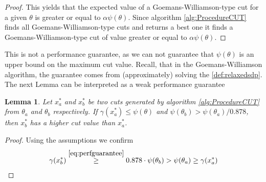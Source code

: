 \documentclass[12pt,a4paper]{article}
\theoremstyle{mythm}
\newtheorem{lem}[thm]{Lemma}
\begin{document}
\begin{proof}
This yields that the expected value of a Goemans-Williamson-type cut for a given $ \theta $ is greater or equal to $ \alpha \psi ( \theta)$. 
Since algorithm \ref{alg:ProcedureCUT} finds all Goemans-Williamson-type cuts and returns a best one it finds a Goemans-Williamson-type cut of value greater or equal to $ \alpha \psi ( \theta) $.

\end{proof}
This is not a performance guarantee, as we can not guarantee that $ \psi ( \theta)  $ is an upper bound on the maximum cut value.
Recall, that in the Goemans-Williamson algorithm, the guarantee comes from (approximately) solving the \SDP \ref{def:relaxedsdp}.
The next Lemma can be interpreted as a weak performance guarantee
\begin{lem}
Let $ x ^{*} _{ a } $ and $ x ^{*} _{ b } $ be two cuts generated by algorithm \ref{alg:ProcedureCUT} from $ \theta_a $ and $ \theta_b $ respectively.
If $ \gamma ( x ^{ * } _{ a } ) \leq \psi ( \theta) $ and $ \psi ( \theta _{ b } ) > \psi ( \theta_a)/0.878 $, then $ x ^{ * } _{ b }  $ has a higher cut value than $ x ^{ * }
_{ a }  $.
\end{lem} 
\begin{proof}
Using the assumptions we confirm
\begin{align*}
\gamma ( x ^{ * } _{ b } ) \overset{ \ref{eq:perfguarantee}  }{ \geq  } 0.878 \cdot \psi ( \theta_b) > \psi ( \theta_a) \geq \gamma ( x ^{ * } _{ a } ) 
\end{align*} 
\end{proof}
\end{document}
